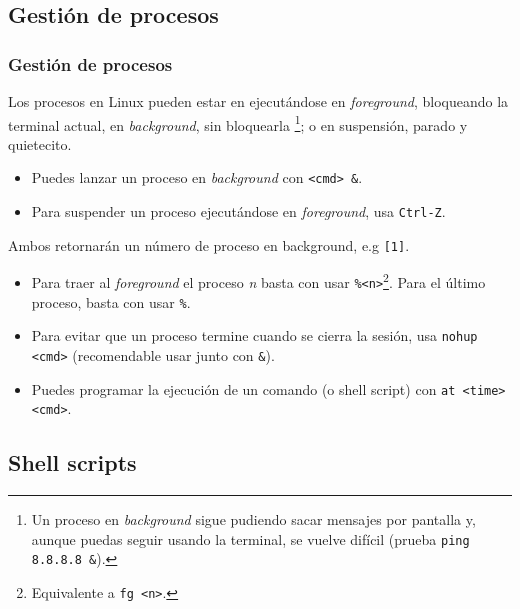 \documentclass[aspectratio=43]{beamer}
\begin{document}
\subsection{Gestión de procesos}

\begin{frame}
    \frametitle{Gestión de procesos}
    
    Los procesos en Linux pueden estar en ejecutándose en \textit{foreground}, bloqueando la terminal actual, en \textit{background}, sin bloquearla \footnote{Un proceso en \textit{background} sigue pudiendo sacar mensajes por pantalla y, aunque puedas seguir usando la terminal, se vuelve difícil (prueba \texttt{ping 8.8.8.8 \&}).}; o en suspensión, parado y quietecito.

    \begin{itemize}
        \item Puedes lanzar un proceso en \textit{background} con \texttt{<cmd> \&}. 
        \item Para suspender un proceso ejecutándose en \textit{foreground}, usa \texttt{Ctrl-Z}.
    \end{itemize}
    
    Ambos retornarán un número de proceso en background, e.g \texttt{[1]}.
    
    \begin{itemize}
        \item Para traer al \textit{foreground} el proceso \textit{n} basta con usar \texttt{\%<n>}\footnote{Equivalente a \texttt{fg <n>}.}. Para el último proceso, basta con usar \texttt{\%}.
        \item Para evitar que un proceso termine cuando se cierra la sesión, usa \texttt{nohup <cmd>} (recomendable usar junto con \texttt{\&}).
        \item Puedes programar la ejecución de un comando (o shell script) con \texttt{at <time> <cmd>}.
    \end{itemize}

\end{frame}


\subsection{Shell scripts}
\end{document}
